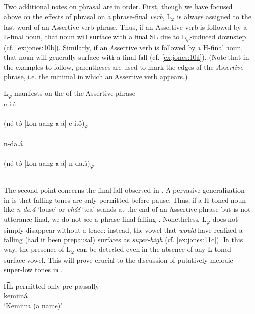 \documentclass[output=paper,newtxmath,modfonts,nonflat,hidelinks]{langsci/langscibook}
\begin{document}
Two additional notes on phrasal  are in order. First, though we have focused above on the effects of phrasal  on a phrase-final \textit{verb}, L\textsubscript{$\varphi $} is always assigned to the last word of an Assertive verb phrase. Thus, if an Assertive verb is followed by a L-final noun, that noun will surface with a final SL  due to L\textsubscript{$\varphi $}-induced downstep (cf. \ref{ex:jones:10b}). Similarly, if an Assertive verb is followed by a H-final noun, that noun will generally surface with a final fall (cf. \ref{ex:jones:10d}). (Note that in the examples to follow, parentheses are used to mark the edges of the \textit{Assertive} phrase, i.e. the minimal  in which an Assertive verb appears.)

\largerpage
\ea\label{ex:jones:10}
{L\textsubscript{$\varphi $} manifests on the  of the Assertive phrase}\\
\ea\label{ex:jones:10a}
{e-i.ò} \\
\\
\ex\label{ex:jones:10b}
{(né-tó-[kon-aang-a-á] e-i.ȍ)\textsubscript{$\varphi $}} \\
\\
\ex\label{ex:jones:10c}
{n-da.á} \\
\\
\ex\label{ex:jones:10d}
{(né-tó-[kon-aang-a-á] n-da.â)\textsubscript{$\varphi $}} \\
\\
\z
\z

The second point concerns the final fall observed in . A pervasive generalization in  is that falling tones are only permitted before pause. Thus, if a H-toned noun like \textit{n-da.á} ‘louse’ or \textit{cháí} ‘tea’ stands at the end of an Assertive phrase but is not utterance-final, we do not see a phrase-final falling . Nonetheless, L\textsubscript{$\varphi $} does not simply disappear without a trace: instead, the vowel that \textit{would} have realized a falling  (had it been prepausal) surfaces as \textit{super-high} (cf. \ref{ex:jones:11c}). In this way, the presence of L\textsubscript{$\varphi $} can be detected even in the absence of any L-toned surface vowel. This will prove crucial to the discussion of putatively melodic super-low tones in .

\ea\label{ex:jones:11}
H͡L permitted only pre-pausally \citep[252]{Roberts-Kohno2000}\\
\ea\label{ex:jones:11a}
{kemiiná} \\
\glt   ‘Kemiina (a name)’
\end{document}
